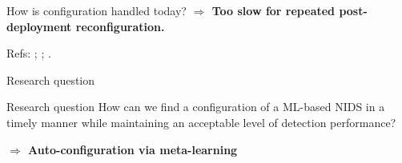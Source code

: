 \begin{frame}{How is configuration handled today?}
	\vspace{0.15em}
	\centering
	\footnotesize\textbf{$\Longrightarrow$ Too slow for repeated post-deployment reconfiguration.}

	\vspace{0.14em}
	{\fontsize{5.8}{6.5}\selectfont Refs: ; ; .}
\end{frame}

\begin{frame}{Research question}
	\small

	\begin{block}{Research question}
		How can we find a configuration of a ML-based NIDS in a timely manner while maintaining an acceptable level of detection performance?
	\end{block}

	\vspace{0.2em}
	\centering
	\small\textbf{$\Rightarrow$ Auto-configuration via meta-learning}
\end{frame}

%
%
%
%
%
%

